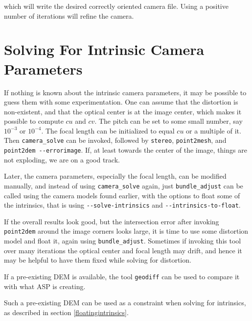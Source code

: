 which will write the desired correctly oriented camera file. Using a positive
number of iterations will refine the camera. 

\section{Solving For Intrinsic Camera Parameters}
\label{findintrinsics}

If nothing is known about the intrinsic camera parameters, it may be
possible to guess them with some experimentation. One can assume that
the distortion is non-existent, and that the optical center is at the
image center, which makes it possible to compute $cu$ and $cv$. The
pitch can be set to some small number, say $10^{-3}$ or $10^{-4}.$ The
focal length can be initialized to equal $cu$ or a multiple of it. Then
\texttt{camera\_solve} can be invoked, followed by \texttt{stereo},
\texttt{point2mesh}, and \texttt{point2dem -\/-errorimage}. If, at least
towards the center of the image, things are not exploding, we are on a
good track.

Later, the camera parameters, especially the focal length, can be
modified manually, and instead of using \texttt{camera\_solve} again,
just \texttt{bundle\_adjust} can be called using the camera models found
earlier, with the options to float some of the intrinsics, that is using
\texttt{-\/-solve-intrinsics} and \texttt{-\/-intrinsics-to-float}.

If the overall results look good, but the intersection error after invoking \texttt{point2dem} around the image corners
looks large, it is time to use some distortion model and float it, again using \texttt{bundle\_adjust}. 
Sometimes if invoking this tool over many iterations the optical center and focal length may drift, and hence it may be
helpful to have them fixed while solving for distortion. 

If a pre-existing DEM is available, the tool \texttt{geodiff} can be used to compare it with what ASP is creating. 

Such a pre-existing DEM can be used as a constraint when solving for intrinsics, as described in section \ref{floatingintrinsics}.

